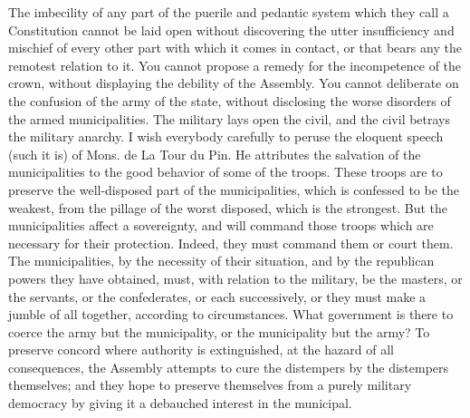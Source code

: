 The imbecility of any part of the puerile and pedantic system which they call a Constitution cannot be laid open without discovering the utter insufficiency and mischief of every other part with which it comes in contact, or that bears any the remotest relation to it. You cannot propose a remedy for the incompetence of the crown, without displaying the debility of the Assembly. You cannot deliberate on the confusion of the army of the state, without disclosing the worse disorders of the armed municipalities. The military lays open the civil, and the civil betrays the military anarchy. I wish everybody carefully to peruse the eloquent speech (such it is) of Mons. de La Tour du Pin. He attributes the salvation of the municipalities to the good behavior of some of the troops. These troops are to preserve the well-disposed part of the municipalities, which is confessed to be the weakest, from the pillage of the worst disposed, which is the strongest. But the municipalities affect a sovereignty, and will command those troops which are necessary for their protection. Indeed, they must command them or court them. The municipalities, by the necessity of their situation, and by the republican powers they have obtained, must, with relation to the military, be the masters, or the servants, or the confederates, or each successively, or they must make a jumble of all together, according to circumstances. What government is there to coerce the army but the municipality, or the municipality but the army? To preserve concord where authority is extinguished, at the hazard of all consequences, the Assembly attempts to cure the distempers by the distempers themselves; and they hope to preserve themselves from a purely military democracy by giving it a debauched interest in the municipal.

